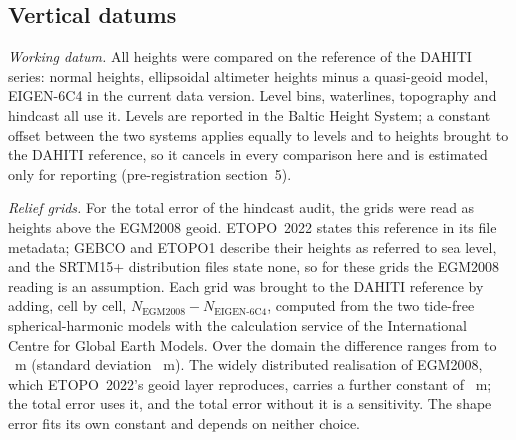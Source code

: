 
\subsection*{Vertical datums}
\emph{Working datum.} All heights were compared on the reference of the DAHITI series: normal heights, ellipsoidal altimeter heights minus a quasi-geoid model\citep{schwatke2015}, EIGEN-6C4 in the current data version\citep{dahiti_wl,forste2014}. Level bins, waterlines, topography and hindcast all use it. Levels are reported in the Baltic Height System; a constant offset between the two systems applies equally to levels and to heights brought to the DAHITI reference, so it cancels in every comparison here and is estimated only for reporting (pre-registration section~5).

\emph{Relief grids.} For the total error of the hindcast audit, the grids were read as heights above the EGM2008 geoid\citep{pavlis2012}. ETOPO~2022 states this reference in its file metadata\citep{macferrin2025}; GEBCO and ETOPO1 describe their heights as referred to sea level\citep{gebco2026,amante2009}, and the SRTM15+ distribution files state none\citep{tozer2019}, so for these grids the EGM2008 reading is an assumption. Each grid was brought to the DAHITI reference by adding, cell by cell, $N_{\mathrm{EGM2008}} - N_{\mathrm{EIGEN\text{-}6C4}}$, computed from the two tide-free spherical-harmonic models with the calculation service of the International Centre for Global Earth Models\citep{ince2019}. Over the domain the difference ranges from  to ~m (standard deviation ~m). The widely distributed realisation of EGM2008, which ETOPO~2022's geoid layer reproduces, carries a further constant of ~m; the total error uses it, and the total error without it is a sensitivity. The shape error fits its own constant and depends on neither choice.

